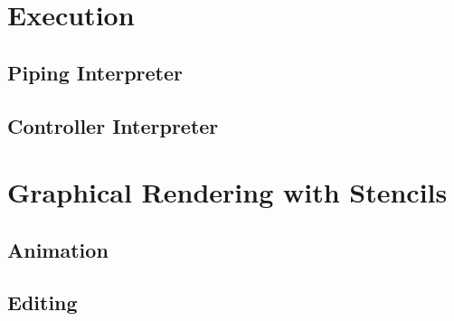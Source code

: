 \documentclass[11pt]{article}
\begin{document}
\section{Execution}

\subsection{Piping Interpreter}

\subsection{Controller Interpreter}

\section{Graphical Rendering with Stencils}

\subsection{Animation}

\subsection{Editing}
\end{document}

